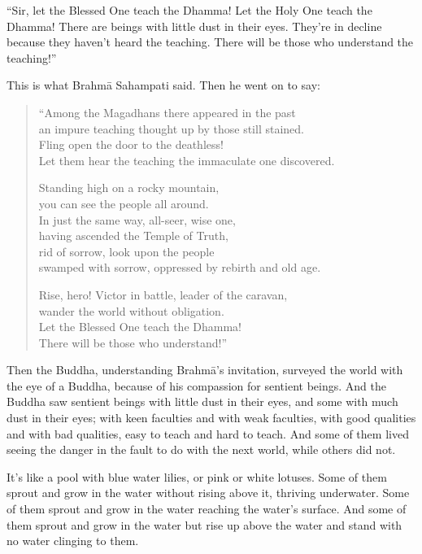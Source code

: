 \documentclass[12pt,openany]{book}%
\begin{document}
“Sir, let the Blessed One teach the Dhamma! Let the Holy One teach the Dhamma! There are beings with little dust in their eyes. They’re in decline because they haven’t heard the teaching. There will be those who understand the teaching!” 

This is what \textsanskrit{Brahmā} Sahampati said. Then he went on to say: 

\begin{verse}%
“Among the Magadhans there appeared in the past \\
an impure teaching thought up by those still stained. \\
Fling open the door to the deathless! \\
Let them hear the teaching the immaculate one discovered. 

Standing high on a rocky mountain, \\
you can see the people all around. \\
In just the same way, all-seer, wise one, \\
having ascended the Temple of Truth, \\
rid of sorrow, look upon the people \\
swamped with sorrow, oppressed by rebirth and old age. 

Rise, hero! Victor in battle, leader of the caravan, \\
wander the world without obligation. \\
Let the Blessed One teach the Dhamma! \\
There will be those who understand!” 

%
\end{verse}

Then the Buddha, understanding \textsanskrit{Brahmā}’s invitation, surveyed the world with the eye of a Buddha, because of his compassion for sentient beings. And the Buddha saw sentient beings with little dust in their eyes, and some with much dust in their eyes; with keen faculties and with weak faculties, with good qualities and with bad qualities, easy to teach and hard to teach. And some of them lived seeing the danger in the fault to do with the next world, while others did not. 

It’s like a pool with blue water lilies, or pink or white lotuses. Some of them sprout and grow in the water without rising above it, thriving underwater. Some of them sprout and grow in the water reaching the water’s surface. And some of them sprout and grow in the water but rise up above the water and stand with no water clinging to them. 
\end{document}
